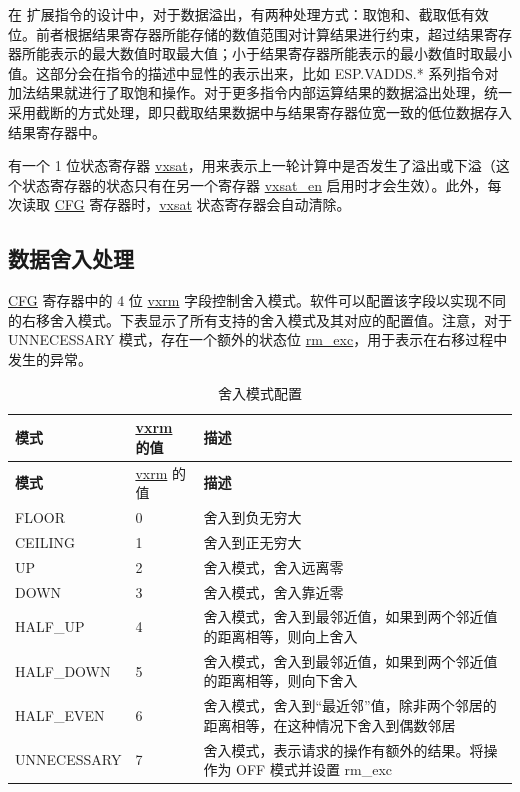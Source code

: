 \documentclass[main\_\_CN.tex]{subfiles}
\begin{document}
在 \chipname{} 扩展指令的设计中，对于数据溢出，有两种处理方式：取饱和、截取低有效位。前者根据结果寄存器所能存储的数值范围对计算结果进行约束，超过结果寄存器所能表示的最大数值时取最大值；小于结果寄存器所能表示的最小数值时取最小值。这部分会在指令的描述中显性的表示出来，比如 ESP.VADDS.* 系列指令对加法结果就进行了取饱和操作。对于更多指令内部运算结果的数据溢出处理，统一采用截断的方式处理，即只截取结果数据中与结果寄存器位宽一致的低位数据存入结果寄存器中。

有一个 1 位状态寄存器 \hyperref[vxsat]{vxsat}，用来表示上一轮计算中是否发生了溢出或下溢（这个状态寄存器的状态只有在另一个寄存器 \hyperref[vxsat_en]{vxsat\_en} 启用时才会生效）。此外，每次读取 \hyperref[regdesc:ESPCFG]{CFG} 寄存器时，\hyperref[vxsat]{vxsat} 状态寄存器会自动清除。



\subsection{数据舍入处理}

\hyperref[regdesc:ESPCFG]{CFG} 寄存器中的 4 位 \hyperref[vxrm]{vxrm} 字段控制舍入模式。软件可以配置该字段以实现不同的右移舍入模式。下表显示了所有支持的舍入模式及其对应的配置值。注意，对于 UNNECESSARY 模式，存在一个额外的状态位 \hyperref[rm_exc]{rm\_exc}，用于表示在右移过程中发生的异常。

\begin{longtable}[c]{|l|l|m{10cm}|}
    \caption{舍入模式配置}
    \label{tab:ESP-rounding-mode-config}\\
    \hline
    \rowcolor{lightgray}
    \textbf{模式} & \hyperref[vxrm]{vxrm} 的值 & \textbf{描述} \\\hline
    \endfirsthead
    \rowcolor{lightgray}
    \textbf{模式} & \hyperref[vxrm]{vxrm} 的值 & \textbf{描述} \\\hline
    \endhead
    \endfoot

FLOOR & 0 & 舍入到负无穷大 \\\hline

CEILING & 1 & 舍入到正无穷大 \\\hline

UP & 2 & 舍入模式，舍入远离零 \\\hline

DOWN & 3 & 舍入模式，舍入靠近零 \\\hline

HALF\_UP & 4 & 舍入模式，舍入到最邻近值，如果到两个邻近值的距离相等，则向上舍入 \\\hline

HALF\_DOWN & 5 & 舍入模式，舍入到最邻近值，如果到两个邻近值的距离相等，则向下舍入 \\\hline

HALF\_EVEN & 6 & 舍入模式，舍入到“最近邻”值，除非两个邻居的距离相等，在这种情况下舍入到偶数邻居 \\\hline

UNNECESSARY & 7 & 舍入模式，表示请求的操作有额外的结果。将操作为 OFF 模式并设置 rm\_exc \\\hline

    \end{longtable}
\end{document}
